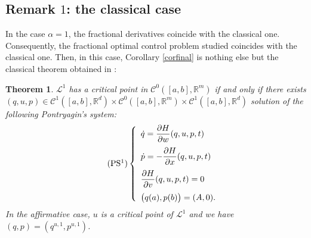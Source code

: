\documentclass[english,11pt,reqno]{smfart}
\newtheorem{theorem}{Theorem}
\newcommand{\R}{\mathbb{R}}
\newcommand{\LL}{\mathcal{L}}
\newcommand{\CC}{\mathscr{C}}
\begin{document}
\subsection{Remark $1$: the classical case}\label{section23} In the case $\alpha =1$, the fractional derivatives coincide with the classical one. Consequently, the fractional optimal control problem studied coincides with the classical one. Then, in this case, Corollary \ref{corfinal} is nothing else but the classical theorem obtained in \cite{berg,favi,gunz2,gunz}:
\begin{theorem}\label{corfinalclass}
$\LL^1$ has a critical point in $\CC^0 ([a,b],\R^m)$ if and only if there exists $(q,u,p) \in \CC^{1} ([a,b],\R^d) \times \CC^0 ([a,b],\R^m) \times \CC^{1} ([a,b],\R^d)$ solution of the following \textit{Pontryagin's system}:
\begin{equation}\tag{PS${}^1 $}\label{eqpsclass}
 \left\lbrace \begin{array}{l}
 		\dot{q} = \dfrac{\partial H}{\partial w} (q,u,p,t) \\[10pt]
 		\dot{p} = - \dfrac{\partial H}{\partial x} (q,u,p,t) \\[10pt]
	    \dfrac{\partial H}{\partial v} (q,u,p,t) = 0 \\[10pt]
	    \big( q(a),p(b) \big) = (A,0).
        \end{array}
\right.
\end{equation}
In the affirmative case, $u$ is a critical point of $\LL^1$ and we have $(q,p) = (q^{u,1},p^{u,1})$.
\end{theorem}
\end{document}
